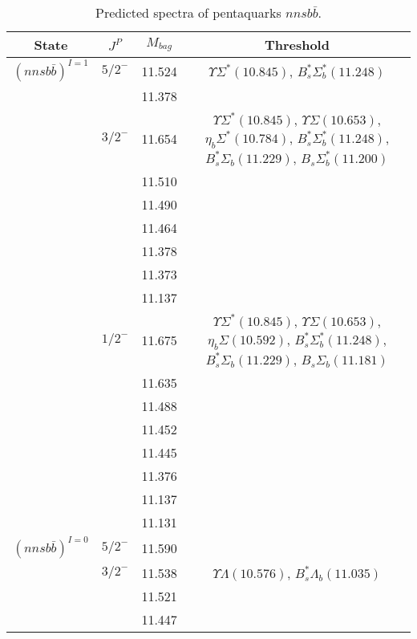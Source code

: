 \documentclass[prd,twocolumn,floatfix,nofootinbib]{revtex4}
\begin{document}
\renewcommand{\tabcolsep}{0.2cm}
\renewcommand{\arraystretch}{1.2}
\begin{table*}[!htbp]
    \caption{Predicted spectra of pentaquarks $nnsb\bar{b}$.}
    \begin{tabular}{cccc}
        \hline\hline
        {\rm State} &$J^{P}$ &$M_{bag}$ &Threshold \\ \hline
        ${(nnsb\bar{b})}^{I=1}$
            &${5/2}^{-}$    &11.524 &$\Upsilon\Sigma^{\ast}(10.845)$, $B_{s}^{\ast}\Sigma_{b}^{\ast}(11.248)$ \\
            &               &11.378 & \\
            &${3/2}^{-}$    &11.654 &$\Upsilon\Sigma^{\ast}(10.845)$, $\Upsilon\Sigma(10.653)$, $\eta_{b}\Sigma^{\ast}(10.784)$, $B_{s}^{\ast}\Sigma_{b}^{\ast}(11.248)$, $B_{s}^{\ast}\Sigma_{b}(11.229)$, $B_{s}\Sigma_{b}^{\ast}(11.200)$ \\
            &               &11.510 & \\
            &               &11.490 & \\
            &               &11.464 & \\
            &               &11.378 & \\
            &               &11.373 & \\
            &               &11.137 & \\
            &${1/2}^{-}$    &11.675 &$\Upsilon\Sigma^{\ast}(10.845)$, $\Upsilon\Sigma(10.653)$, $\eta_{b}\Sigma(10.592)$, $B_{s}^{\ast}\Sigma_{b}^{\ast}(11.248)$, $B_{s}^{\ast}\Sigma_{b}(11.229)$, $B_{s}\Sigma_{b}(11.181)$ \\
            &               &11.635 & \\
            &               &11.488 & \\
            &               &11.452 & \\
            &               &11.445 & \\
            &               &11.376 & \\
            &               &11.137 & \\
            &               &11.131 & \\
        ${(nnsb\bar{b})}^{I=0}$
            &${5/2}^{-}$    &11.590 & \\
            &${3/2}^{-}$    &11.538 &$\Upsilon\Lambda(10.576)$, $B_{s}^{\ast}\Lambda_{b}(11.035)$ \\
            &               &11.521 & \\
            &               &11.447 & \\

\end{tabular}
\end{table*}
\end{document}
